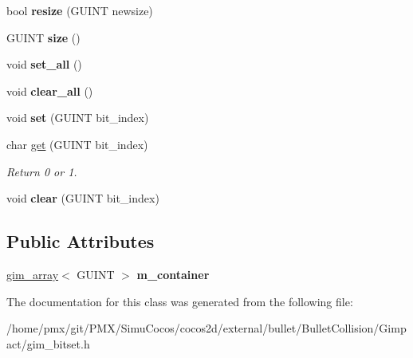 \begin{DoxyCompactItemize}
bool {\bfseries resize} (G\+U\+I\+NT newsize)
\item 
\mbox{\label{classgim__bitset_aa07758d41967a1da50ae8f7cb04d0cc3}} 
G\+U\+I\+NT {\bfseries size} ()
\item 
\mbox{\label{classgim__bitset_a903c948276d62b7f8cbb49b369b98ab0}} 
void {\bfseries set\+\_\+all} ()
\item 
\mbox{\label{classgim__bitset_a983f1435bc37a33c9e2a259a14c29cf6}} 
void {\bfseries clear\+\_\+all} ()
\item 
\mbox{\label{classgim__bitset_a8af47716e1519bf587bad9436040c99e}} 
void {\bfseries set} (G\+U\+I\+NT bit\+\_\+index)
\item 
\mbox{\label{classgim__bitset_a62e08efb3b9c5982860ee9ebec3f31a5}} 
char \hyperlink{classgim__bitset_a62e08efb3b9c5982860ee9ebec3f31a5}{get} (G\+U\+I\+NT bit\+\_\+index)
\begin{DoxyCompactList}\small\item\em Return 0 or 1. \end{DoxyCompactList}\item 
\mbox{\label{classgim__bitset_a4a231f6d93a5e6ea21aa1b881399600d}} 
void {\bfseries clear} (G\+U\+I\+NT bit\+\_\+index)
\end{DoxyCompactItemize}
\subsection*{Public Attributes}
\begin{DoxyCompactItemize}
\item 
\mbox{\label{classgim__bitset_a54ebf4b67c23969a92661144463bf1dc}} 
\hyperlink{classgim__array}{gim\+\_\+array}$<$ G\+U\+I\+NT $>$ {\bfseries m\+\_\+container}
\end{DoxyCompactItemize}


The documentation for this class was generated from the following file\+:\begin{DoxyCompactItemize}
\item 
/home/pmx/git/\+P\+M\+X/\+Simu\+Cocos/cocos2d/external/bullet/\+Bullet\+Collision/\+Gimpact/gim\+\_\+bitset.\+h\end{DoxyCompactItemize}
